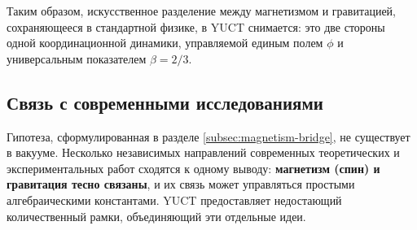 \documentclass[12pt]{article}
\theoremstyle{remark}
\begin{document}
	Таким образом, искусственное разделение между магнетизмом и гравитацией, сохраняющееся в стандартной физике, в YUCT снимается: это две стороны одной координационной динамики, управляемой единым полем $\phi$ и универсальным показателем $\beta = 2/3$.
	
	\subsection{Связь с современными исследованиями}
	\label{subsec:mainstream}
	
	Гипотеза, сформулированная в разделе \ref{subsec:magnetism-bridge}, не существует в вакууме. Несколько независимых направлений современных теоретических и экспериментальных работ сходятся к одному выводу: \textbf{магнетизм (спин) и гравитация тесно связаны}, и их связь может управляться простыми алгебраическими константами. YUCT предоставляет недостающий количественный рамки, объединяющий эти отдельные идеи.
	
\end{document}
